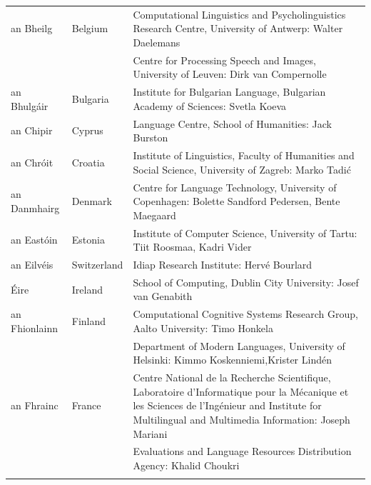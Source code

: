 \small
\begin{longtable}{@{}llp{113mm}@{}}
  an Bheilg & \textcolor{grey1}{Belgium} & Computational Linguistics and Psycholinguistics Research Centre, University of Antwerp: Walter Daelemans\\ \addlinespace
  & & Centre for Processing Speech and Images, University of Leuven: Dirk van Compernolle \\ \addlinespace
  
  an Bhulgáir & \textcolor{grey1}{Bulgaria} & Institute for Bulgarian Language, Bulgarian Academy of Sciences: Svetla Koeva \\ \addlinespace
  
  an Chipir & \textcolor{grey1}{Cyprus} & Language Centre, School of Humanities: Jack Burston \\ \addlinespace
  
  an Chróit & \textcolor{grey1}{Croatia} & Institute of Linguistics, Faculty of Humanities and Social Science, University of Zagreb: Marko Tadić \\ \addlinespace
  
  an Danmhairg &  \textcolor{grey1}{Denmark} & Centre for Language Technology, University of Copenhagen: \newline Bolette Sandford Pedersen, Bente Maegaard\\ \addlinespace
  
  an Eastóin & \textcolor{grey1}{Estonia} & Institute of Computer Science, University of Tartu: Tiit Roosmaa, Kadri Vider\\ \addlinespace
  
  an Eilvéis & \textcolor{grey1}{Switzerland} & Idiap Research Institute: Hervé Bourlard \\ \addlinespace
  
  Éire & \textcolor{grey1}{Ireland} & School of Computing, Dublin City University: Josef van Genabith\\ \addlinespace
  
  an Fhionlainn  & \textcolor{grey1}{Finland} & Computational Cognitive Systems Research Group, Aalto University: Timo Honkela\\ \addlinespace
  & & Department of Modern Languages, University of Helsinki: Kimmo Koskenniemi,\newline Krister Lindén \\ \addlinespace
  
  an Fhrainc & \textcolor{grey1}{France} & Centre National de la Recherche Scientifique, Laboratoire d'Informatique pour la Mécanique et les Sciences de l'Ingénieur and Institute for Multilingual and Multimedia Information: Joseph Mariani \\ \addlinespace
  & & Evaluations and Language Resources Distribution Agency: Khalid Choukri\\ \addlinespace
  

\end{longtable}
